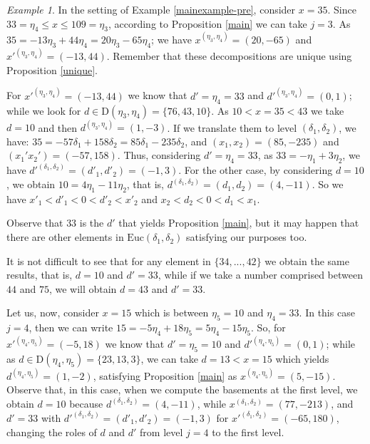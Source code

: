 \documentclass[11pt]{amsart}
\theoremstyle{remark}
\newtheorem{example}[theorem]{Example}
\begin{document}
\begin{example}\label{mainexample-pre2}
In the setting of Example \ref{mainexample-pre}, consider $x=35$. Since $33=\eta_4 \le x \le 109 = \eta_3$, according to Proposition \ref{main} we can take $j=3$.
As $35=-13\eta_3+44\eta_4=20\eta_3-65\eta_4$; we have $x^{(\eta_3,\eta_4)}=(20,-65)$ and $x'^{(\eta_3,\eta_4)}=(-13,44)$. Remember that these decompositions are unique using Proposition \ref{unique}.

For $x'^{(\eta_3,\eta_4)}=(-13,44)$ we know that $d'=\eta_4=33$ and  $d'^{(\eta_3,\eta_4)}=(0,1)$; while we look for $d\in\mathrm{D}(\eta_3,\eta_4)=\{76,43,10\}$. As $10<x=35<43$ we take $d=10$ and then $d^{(\eta_3,\eta_4)}=(1,-3)$. If we translate them to level $(\delta_1,\delta_2)$, we have: $35=-57\delta_1+158\delta_2=85\delta_1-235\delta_2$, and $(x_1,x_2)=(85,-235)$ and $(x_1'x_2')=(-57,158)$. Thus, considering $d'=\eta_4=33$, as $33=-\eta_1+3\eta_2$, we have $d'^{(\delta_1,\delta_2)}=(d'_1,d'_2)=(-1,3)$. For the other case, by considering $d=10$,  we obtain $10=4\eta_1-11\eta_2$, that is, $d^{(\delta_1,\delta_2)}= (d_1,d_2)=(4,-11)$. So we have $x'_1<d'_1<0<d'_2<x'_2$ and $x_2<d_2<0<d_1<x_1$.

Observe that $33$ is the $d'$ that yields Proposition \ref{main}, but it may happen that there are other elements in $\mathrm{Euc}(\delta_1,\delta_2)$ satisfying our purposes too.

It is not difficult to see that for any element in $\{34,...,42\}$ we obtain the same results, that is, $d=10$ and $d'=33$, while if we take a number comprised between $44$ and $75$, we will obtain $d=43$ and $d'=33$.

Let us, now, consider $x=15$ which is between $\eta_5=10$ and $\eta_4=33$. In this case $j=4$, then we can write  $15=-5\eta_4+18\eta_5=5\eta_4-15\eta_5$. So, for $x'^{(\eta_4,\eta_5)}=(-5,18)$ we know that $d'=\eta_5=10$ and  $d'^{(\eta_4,\eta_5)}=(0,1)$; while as $d\in\mathrm{D}(\eta_4,\eta_5)=\{23,13,3\}$, we can take $d=13<x=15$ which yields $d^{(\eta_4,\eta_5)}=(1,-2)$, satisfying Proposition \ref{main} as  $x^{(\eta_4,\eta_5)}=(5,-15)$. Observe that, in this case, when we compute the basements at the first level, we obtain $d=10$ because $d^{(\delta_1,\delta_2)}=(4,-11)$, while $x^{(\delta_1,\delta_2)}=(77,-213)$, and $d'=33$ with $d'^{(\delta_1,\delta_2)}=(d'_1,d'_2)=(-1,3)$ for $x'^{(\delta_1,\delta_2)}=(-65,180)$, changing the roles of $d$ and $d'$ from level $j=4$ to the first level.



\end{example}
\end{document}
